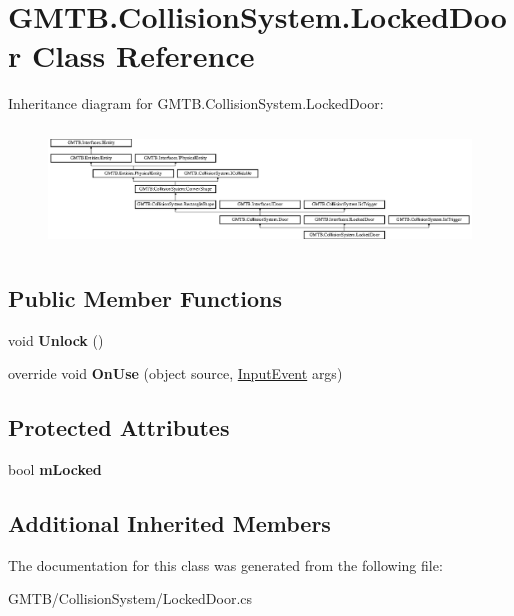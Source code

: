 \hypertarget{class_g_m_t_b_1_1_collision_system_1_1_locked_door}{}\section{G\+M\+T\+B.\+Collision\+System.\+Locked\+Door Class Reference}
\label{class_g_m_t_b_1_1_collision_system_1_1_locked_door}
Inheritance diagram for G\+M\+T\+B.\+Collision\+System.\+Locked\+Door\+:\begin{figure}[H]
\begin{center}
\leavevmode
\includegraphics[height=3.226337cm]{class_g_m_t_b_1_1_collision_system_1_1_locked_door}
\end{center}
\end{figure}
\subsection*{Public Member Functions}
\begin{DoxyCompactItemize}
\item 
\mbox{\label{class_g_m_t_b_1_1_collision_system_1_1_locked_door_abbbbcafedbc7bb9960178a2135ab01a5}} 
void {\bfseries Unlock} ()
\item 
\mbox{\label{class_g_m_t_b_1_1_collision_system_1_1_locked_door_a8e327a43bf5cb1f68d079f5d0441febd}} 
override void {\bfseries On\+Use} (object source, \mbox{\hyperlink{class_g_m_t_b_1_1_input_system_1_1_input_event}{Input\+Event}} args)
\end{DoxyCompactItemize}
\subsection*{Protected Attributes}
\begin{DoxyCompactItemize}
\item 
\mbox{\label{class_g_m_t_b_1_1_collision_system_1_1_locked_door_a0481265590cd4c286aa6fdebe0786408}} 
bool {\bfseries m\+Locked}
\end{DoxyCompactItemize}
\subsection*{Additional Inherited Members}


The documentation for this class was generated from the following file\+:\begin{DoxyCompactItemize}
\item 
G\+M\+T\+B/\+Collision\+System/Locked\+Door.\+cs\end{DoxyCompactItemize}
